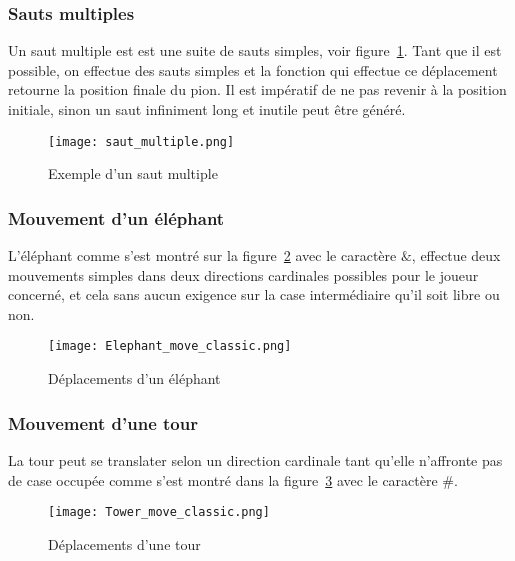 \documentclass[11pt]{article}
\begin{document}
            \subsubsection{Sauts multiples }
                Un saut multiple est est une suite de sauts simples, voir figure~\ref{figure17}. Tant que il est possible, on effectue des sauts simples et la fonction qui effectue ce déplacement retourne la position finale du pion. Il est impératif de ne pas revenir à la position initiale, sinon un saut infiniment long et inutile peut être généré.
                \begin{figure}[h]
                                \centering
                                \texttt{[image: saut\_multiple.png]}
                                \caption{ Exemple d'un saut multiple}
                                \label{figure17}
                                \end{figure}
                \newpage
            \subsubsection{Mouvement d'un éléphant}
                L'éléphant comme s'est montré sur la figure~\ref{figure60} avec le caractère $\&$, effectue deux mouvements simples dans deux directions cardinales possibles pour le joueur concerné, et cela sans aucun exigence sur la case intermédiaire qu'il soit libre ou non.
                \begin{figure}[h]
                                \centering
                                \texttt{[image: Elephant\_move\_classic.png]}
                                \caption{ Déplacements d'un éléphant}
                                \label{figure60}
                                \end{figure}
            \subsubsection{Mouvement d'une tour}
                La tour peut se translater selon un direction cardinale tant qu'elle n'affronte pas de case occupée comme s'est montré dans la figure~\ref{figure61} avec le caractère $\#$. 
                \begin{figure}[h]
                                \centering
                                \texttt{[image: Tower\_move\_classic.png]}
                                \caption{ Déplacements d'une tour}
                                \label{figure61}
                                \end{figure}
\end{document}
